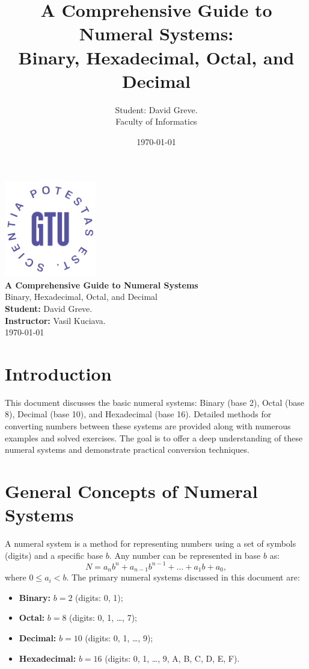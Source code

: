 \documentclass[12pt,a4paper]{article}
\title{\textbf{A Comprehensive Guide to Numeral Systems:\\ Binary, Hexadecimal, Octal, and Decimal}}
\author{Student: David Greve.\\Faculty of Informatics}
\date{\today}
\begin{document}
\begin{titlepage}
    \centering
    \vspace*{1cm}
    \includegraphics[width=0.3\textwidth]{Georgian-Tech-logo.png}\\[1cm]
    {\LARGE \textbf{A Comprehensive Guide to Numeral Systems}}\\[1cm]
    {\Large Binary, Hexadecimal, Octal, and Decimal}\\[2cm]
    \textbf{Student:} David Greve.\\[0.5cm]
    \textbf{Instructor:} Vasil Kuciava.\\[2cm]
    {\large \today}
    \vfill
\end{titlepage}

\tableofcontents
\newpage

\section{Introduction}
This document discusses the basic numeral systems: Binary (base 2), Octal (base 8), Decimal (base 10), and Hexadecimal (base 16). Detailed methods for converting numbers between these systems are provided along with numerous examples and solved exercises. The goal is to offer a deep understanding of these numeral systems and demonstrate practical conversion techniques.

\section{General Concepts of Numeral Systems}
A numeral system is a method for representing numbers using a set of symbols (digits) and a specific base \(b\). Any number can be represented in base \(b\) as:
\[
N = a_n b^n + a_{n-1} b^{n-1} + \dots + a_1 b + a_0,
\]
where \(0 \leq a_i < b\). The primary numeral systems discussed in this document are:
\begin{itemize}[label=\(\bullet\)]
    \item \textbf{Binary:} \(b = 2\) (digits: 0, 1);
    \item \textbf{Octal:} \(b = 8\) (digits: 0, 1, \dots, 7);
    \item \textbf{Decimal:} \(b = 10\) (digits: 0, 1, \dots, 9);
    \item \textbf{Hexadecimal:} \(b = 16\) (digits: 0, 1, \dots, 9, A, B, C, D, E, F).
\end{itemize}
\end{document}
